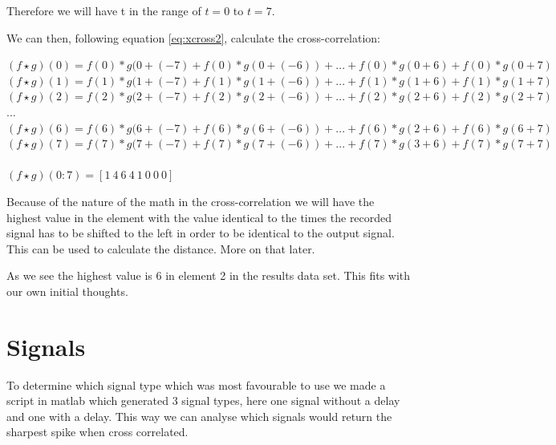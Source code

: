 Therefore we will have t in the range of $t=0$ to $t=7$. 

We can then, following equation \ref{eq:xcross2}, calculate the cross-correlation:

\begin{center}
$(f\star g)(0)=f(0)*g(0+(-7)+f(0)*g(0+(-6))+...+f(0)*g(0+6)+f(0)*g(0+7)$\\
$(f\star g)(1)=f(1)*g(1+(-7)+f(1)*g(1+(-6))+...+f(1)*g(1+6)+f(1)*g(1+7)$\\
$(f\star g)(2)=f(2)*g(2+(-7)+f(2)*g(2+(-6))+...+f(2)*g(2+6)+f(2)*g(2+7)$\\
$...$\\
$(f\star g)(6)=f(6)*g(6+(-7)+f(6)*g(6+(-6))+...+f(6)*g(2+6)+f(6)*g(6+7)$\\
$(f\star g)(7)=f(7)*g(7+(-7)+f(7)*g(7+(-6))+...+f(7)*g(3+6)+f(7)*g(7+7)$\\
\ \\
$(f\star g)(0:7)=[1\ 4\ 6\ 4\ 1\ 0\ 0\ 0]$\\
\end{center}

Because of the nature of the math in the cross-correlation we will have the highest value in the element with the value identical to the times the recorded signal has to be shifted to the left in order to be identical to the output signal. This can be used to calculate the distance. More on that later.

As we see the highest value is 6 in element 2 in the results data set. This fits with our own initial thoughts.

\section{Signals}
To determine which signal type which was most favourable to use we made a script in matlab which generated 3 signal types, here one signal without a delay and one with a delay. This way we can analyse which signals would return the sharpest spike when cross correlated.
